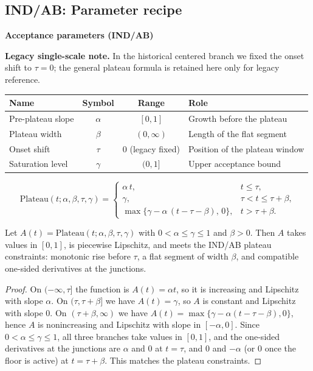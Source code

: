 \subsection{IND/AB: Parameter recipe}\label{sec:ind-ab-params}

\begin{center}
  \small\textbf{Acceptance parameters (IND/AB)}
\end{center}
\noindent\textbf{Legacy single-scale note.} In the historical centered branch we fixed the onset shift to $\tau=0$; the general plateau formula is retained here only for legacy reference.
\begin{center}
  \small
  \begin{tabular}{lccp{}}
    \hline
    Name & Symbol & Range & Role \\
    \hline
    Pre-plateau slope & $\alpha$ & $[0,1]$ & Growth before the plateau \\
    Plateau width & $\beta$ & $(0,\infty)$ & Length of the flat segment \\
    Onset shift & $\tau$ & $0$ (legacy fixed) & Position of the plateau window \\
    Saturation level & $\gamma$ & $(0,1]$ & Upper acceptance bound \\
    \hline
  \end{tabular}
\end{center}

\begin{equation}\label{eq:param_recipe-plateau-defs}
\mathrm{Plateau}(t;\alpha,\beta,\tau,\gamma)=
\begin{cases}
\alpha\,t, & t\le \tau,\\[2pt]
\gamma, & \tau<t\le \tau+\beta,\\[2pt]
\max\{\gamma-\alpha\,(t-\tau-\beta),\,0\}, & t>\tau+\beta.
\end{cases}
\end{equation}

\begin{lemma}\label{lem:param_schedule_plateau}
Let $A(t)=\mathrm{Plateau}(t;\alpha,\beta,\tau,\gamma)$ with
$0<\alpha\le\gamma\le1$ and $\beta>0$. Then $A$ takes values in $[0,1]$,
is piecewise Lipschitz, and meets the IND/AB plateau constraints:
monotonic rise before $\tau$, a flat segment of width $\beta$, and
compatible one-sided derivatives at the junctions.
\end{lemma}

\begin{proof}
On $(-\infty,\tau]$ the function is $A(t)=\alpha t$, so it is increasing and Lipschitz with slope $\alpha$.
On $(\tau,\tau+\beta]$ we have $A(t)=\gamma$, so $A$ is constant and Lipschitz with slope $0$.
On $(\tau+\beta,\infty)$ we have $A(t)=\max\{\gamma-\alpha(t-\tau-\beta),0\}$, hence $A$ is nonincreasing
and Lipschitz with slope in $[-\alpha,0]$. Since $0<\alpha\le\gamma\le1$, all three branches take values in $[0,1]$,
and the one-sided derivatives at the junctions are $\alpha$ and $0$ at $t=\tau$, and $0$ and $-\alpha$ (or $0$ once the
floor is active) at $t=\tau+\beta$. This matches the plateau constraints.
\end{proof}
